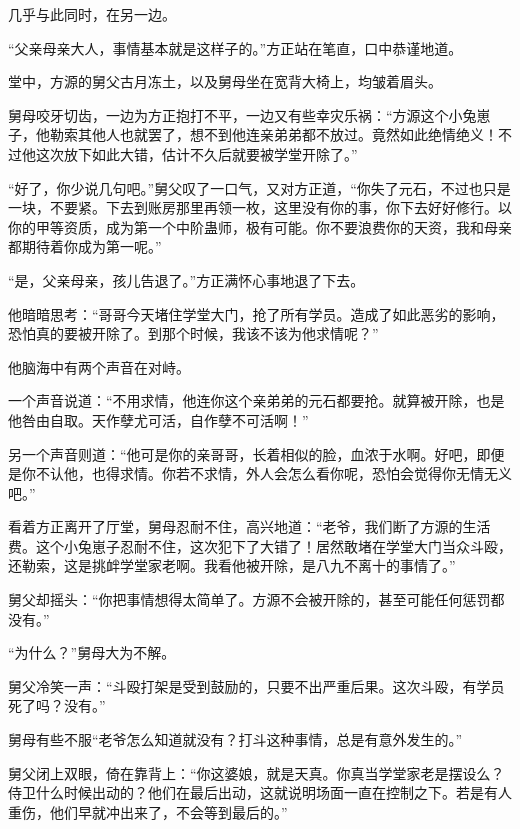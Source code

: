 
\begin{this_body}

几乎与此同时，在另一边。

“父亲母亲大人，事情基本就是这样子的。”方正站在笔直，口中恭谨地道。

堂中，方源的舅父古月冻土，以及舅母坐在宽背大椅上，均皱着眉头。

舅母咬牙切齿，一边为方正抱打不平，一边又有些幸灾乐祸：“方源这个小兔崽子，他勒索其他人也就罢了，想不到他连亲弟弟都不放过。竟然如此绝情绝义！不过他这次放下如此大错，估计不久后就要被学堂开除了。”

“好了，你少说几句吧。”舅父叹了一口气，又对方正道，“你失了元石，不过也只是一块，不要紧。下去到账房那里再领一枚，这里没有你的事，你下去好好修行。以你的甲等资质，成为第一个中阶蛊师，极有可能。你不要浪费你的天资，我和母亲都期待着你成为第一呢。”

“是，父亲母亲，孩儿告退了。”方正满怀心事地退了下去。

他暗暗思考：“哥哥今天堵住学堂大门，抢了所有学员。造成了如此恶劣的影响，恐怕真的要被开除了。到那个时候，我该不该为他求情呢？”

他脑海中有两个声音在对峙。

一个声音说道：“不用求情，他连你这个亲弟弟的元石都要抢。就算被开除，也是他咎由自取。天作孽尤可活，自作孽不可活啊！”

另一个声音则道：“他可是你的亲哥哥，长着相似的脸，血浓于水啊。好吧，即便是你不认他，也得求情。你若不求情，外人会怎么看你呢，恐怕会觉得你无情无义吧。”

看着方正离开了厅堂，舅母忍耐不住，高兴地道：“老爷，我们断了方源的生活费。这个小兔崽子忍耐不住，这次犯下了大错了！居然敢堵在学堂大门当众斗殴，还勒索，这是挑衅学堂家老啊。我看他被开除，是八九不离十的事情了。”

舅父却摇头：“你把事情想得太简单了。方源不会被开除的，甚至可能任何惩罚都没有。”

“为什么？”舅母大为不解。

舅父冷笑一声：“斗殴打架是受到鼓励的，只要不出严重后果。这次斗殴，有学员死了吗？没有。”

舅母有些不服“老爷怎么知道就没有？打斗这种事情，总是有意外发生的。”

舅父闭上双眼，倚在靠背上：“你这婆娘，就是天真。你真当学堂家老是摆设么？侍卫什么时候出动的？他们在最后出动，这就说明场面一直在控制之下。若是有人重伤，他们早就冲出来了，不会等到最后的。”


\end{this_body}
